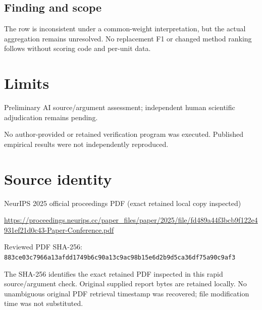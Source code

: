 \documentclass[11pt]{article}
\begin{document}
\subsection*{Finding and scope}

The row is inconsistent under a common-weight interpretation, but the actual aggregation remains unresolved. No replacement F1 or changed method ranking follows without scoring code and per-unit data.

\section*{Limits}

Preliminary AI source/argument assessment; independent human scientific adjudication remains pending.\par

No author-provided or retained verification program was executed. Published empirical results were not independently reproduced.\par

\section*{Source identity}

NeurIPS 2025 official proceedings PDF (exact retained local copy inspected)

\url{https://proceedings.neurips.cc/paper_files/paper/2025/file/fd489a44f3bcb9f122e4931ef21d0c43-Paper-Conference.pdf}

Reviewed PDF SHA-256: \nolinkurl{883ce03c7966a13afdd1749b6c90a13c9ac98b15e6d2b9d5ca36df75a90c9af3}

The SHA-256 identifies the exact retained PDF inspected in this rapid source/argument check. Original supplied report bytes are retained locally. No unambiguous original PDF retrieval timestamp was recovered; file modification time was not substituted.
\end{document}
